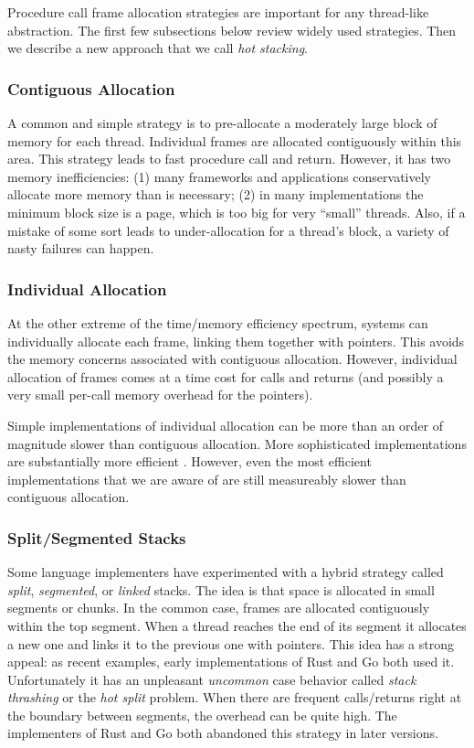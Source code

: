 \documentclass[acmsmall,anonymous,review]{acmart}\settopmatter{printfolios=true,printccs=false,printacmref=false}
\begin{document}
Procedure call frame allocation strategies are important for any thread-like abstraction.
The first few subsections below review widely used strategies.
Then we describe a new approach that we call \emph{hot stacking}.

\subsubsection{Contiguous Allocation}

A common and simple strategy is to pre-allocate a moderately large block of memory for each thread.
Individual frames are allocated contiguously within this area.
This strategy leads to fast procedure call and return.
However, it has two memory inefficiencies: (1) many frameworks and applications conservatively allocate more memory than is necessary; (2) in many implementations the minimum block size is a page, which is too big for very ``small'' threads.
Also, if a mistake of some sort leads to under-allocation for a thread's block, a variety of nasty failures can happen.

\subsubsection{Individual Allocation}

At the other extreme of the time/memory efficiency spectrum, systems can individually allocate each frame, linking them together with pointers.
This avoids the memory concerns associated with contiguous allocation.
However, individual allocation of frames comes at a time cost for calls and returns (and possibly a very small per-call memory overhead for the pointers).

Simple implementations of individual allocation can be more than an order of magnitude slower than contiguous allocation.
More sophisticated implementations are substantially more efficient \cite{Shao2000}.
However, even the most efficient implementations that we are aware of are still measureably slower than contiguous allocation.

\subsubsection{Split/Segmented Stacks}

Some language implementers have experimented with a hybrid strategy called \emph{split}, \emph{segmented}, or \emph{linked} stacks.
The idea is that space is allocated in small segments or chunks.
In the common case, frames are allocated contiguously within the top segment.
When a thread reaches the end of its segment it allocates a new one and links it to the previous one with pointers.
This idea has a strong appeal: as recent examples, early implementations of Rust and Go both used it.
Unfortunately it has an unpleasant \emph{uncommon} case behavior called \emph{stack thrashing} or the \emph{hot split} problem.
When there are frequent calls/returns right at the boundary between segments, the overhead can be quite high.
The implementers of Rust \cite{Anderson2013} and Go \cite{Anastasopoulos2014} both abandoned this strategy in later versions.
\end{document}
